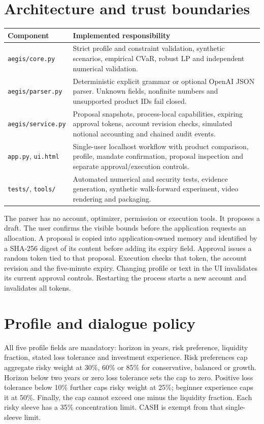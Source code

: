\documentclass[11pt,a4paper]{article}
\begin{document}
\section{Architecture and trust boundaries}
\begin{longtable}{p{.24\linewidth}p{.69\linewidth}}
\toprule Component & Implemented responsibility\\\midrule
\texttt{aegis/core.py} & Strict profile and constraint validation, synthetic scenarios, empirical CVaR, robust LP and independent numerical validation.\\
\texttt{aegis/parser.py} & Deterministic explicit grammar or optional OpenAI JSON parser. Unknown fields, nonfinite numbers and unsupported product IDs fail closed.\\
\texttt{aegis/service.py} & Proposal snapshots, process-local capabilities, expiring approval tokens, account revision checks, simulated notional accounting and chained audit events.\\
\texttt{app.py}, \texttt{ui.html} & Single-user localhost workflow with product comparison, profile, mandate confirmation, proposal inspection and separate approval/execution controls.\\
\texttt{tests/}, \texttt{tools/} & Automated numerical and security tests, evidence generation, synthetic walk-forward experiment, video rendering and packaging.\\\bottomrule
\end{longtable}
The parser has no account, optimizer, permission or execution tools. It proposes a draft. The user confirms the visible bounds before the application requests an allocation. A proposal is copied into application-owned memory and identified by a SHA-256 digest of its content before adding its expiry field. Approval issues a random token tied to that proposal. Execution checks that token, the account revision and the five-minute expiry. Changing profile or text in the UI invalidates its current approval controls. Restarting the process starts a new account and invalidates all tokens.

\section{Profile and dialogue policy}
All five profile fields are mandatory: horizon in years, risk preference, liquidity fraction, stated loss tolerance and investment experience. Risk preferences cap aggregate risky weight at 30\%, 60\% or 85\% for conservative, balanced or growth. Horizon below two years or zero loss tolerance sets the cap to zero. Positive loss tolerance below 10\% further caps risky weight at 25\%; beginner experience caps it at 50\%. Finally, the cap cannot exceed one minus the liquidity fraction. Each risky sleeve has a 35\% concentration limit. CASH is exempt from that single-sleeve limit.
\end{document}
